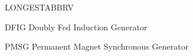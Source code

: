 \begin{theglossary}{LONGESTABBRV}
\item[DFIG] Doubly Fed Induction Generator
\item[PMSG] Permanent Magnet Synchronous Generator

\end{theglossary}
